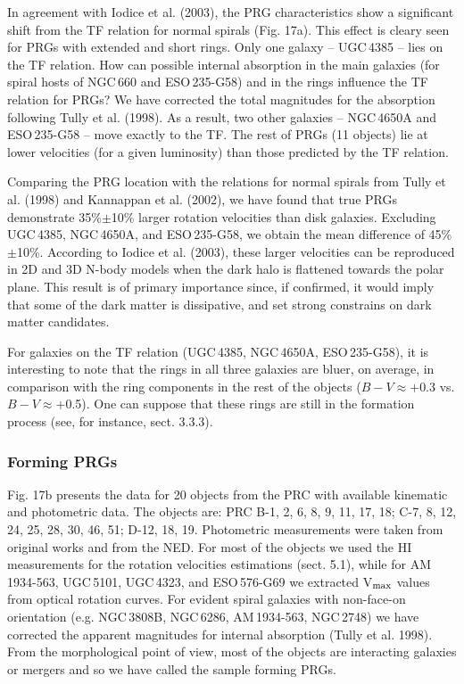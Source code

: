 \documentclass[]{aa}
\begin{document}
In agreement with Iodice et al. (2003), the PRG characteristics
show a significant shift from the TF relation for normal spirals (Fig. 17a). 
This effect is cleary seen for PRGs with extended and short rings.
Only one galaxy -- UGC\,4385 -- lies on the TF relation. How can possible
internal absorption in the main galaxies (for spiral hosts of NGC\,660 and
ESO\,235-G58) and
in the rings influence the TF relation for PRGs? We have corrected
the total magnitudes for the absorption following Tully et al. (1998).
As a result, two other galaxies -- NGC\,4650A and ESO\,235-G58 -- move
exactly to the TF. The rest of PRGs (11 objects) lie at lower velocities
(for a given luminosity) than those predicted by the TF relation.

Comparing the PRG location with the relations for normal spirals from
Tully et al. (1998) and Kannappan et al. (2002), we have found that
true PRGs demonstrate 35\%$\pm$10\% larger rotation velocities than
disk galaxies. Excluding UGC\,4385, NGC\,4650A, and ESO\,235-G58, we
obtain the mean difference of 45\%$\pm$10\%. 
According to Iodice et al. (2003), these larger velocities can be reproduced
in 2D and 3D N-body models when the dark halo is flattened towards
the polar plane. This result is of primary importance since, if
confirmed, it would imply that some of the dark matter is dissipative,
and set strong constrains on dark matter candidates. 

For galaxies on the TF relation (UGC\,4385, NGC\,4650A, 
ESO\,235-G58), it is interesting to note that the rings in 
all three galaxies are bluer, on average, in comparison with
the ring components in the rest of the objects ($B-V\approx +0.3$ vs.
$B-V\approx$+0.5). One can suppose that these rings are still in the
formation process (see, for instance, sect. 3.3.3).

\subsubsection{Forming PRGs}

Fig. 17b presents the data for 20 objects from the PRC with
available kinematic and photometric data. The objects are:
PRC B-1, 2, 6, 8, 9, 11, 17, 18; C-7, 8, 12, 24, 25, 28, 30, 46,
51; D-12, 18, 19. 
Photometric measurements were taken from original works 
and from the NED. For most of the objects we used the HI measurements
for the rotation velocities estimations (sect. 5.1), while for
AM\,1934-563, UGC\,5101, UGC\,4323, and ESO\,576-G69 we extracted
V$_{\rm max}$ values from optical rotation curves. For evident
spiral galaxies with non-face-on orientation (e.g. NGC\,3808B,
NGC\,6286, AM\,1934-563, NGC\,2748) we have corrected the apparent
magnitudes for internal absorption (Tully et al. 1998).
From the morphological point of view, most of the objects are
interacting galaxies or mergers and so we have called the sample
forming PRGs. 
\end{document}

